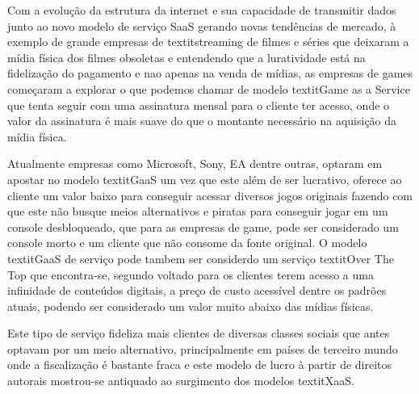 \begin{justify}
    Com a evolução da estrutura da internet e sua capacidade de transmitir dados junto ao novo
    modelo de serviço SaaS gerando novas tendências de mercado, à exemplo de grande empresas de
    textit{streaming} de filmes e séries que deixaram a mídia física dos filmes obsoletas e
    entendendo que a luratividade está na fidelização do pagamento e nao apenas na venda de mídias,
    as empresas de games começaram a explorar o que podemos chamar de modelo textit{Game as a
    Service} que tenta seguir com uma assinatura mensal para o cliente ter acesso, onde o valor da
    assinatura é mais suave do que o montante necessário na aquisição da mídia física.

    Atualmente empresas como Microsoft, Sony, EA dentre outras, optaram em apostar no modelo            
    textit{GaaS} um vez que este além de ser lucrativo, oferece ao cliente um valor baixo para          
    conseguir acessar diversos jogos originais fazendo com que este não busque meios alternativos e     
    piratas para conseguir jogar em um console desbloqueado, que para as empresas de game, pode ser     
    considerado um console morto e um cliente que não consome da fonte original.                        
    O modelo textit{GaaS} de serviço pode tambem ser considerdo um serviço textit{Over The Top} que     
    encontra-se, segundo \cite{tristao2020pirataria} voltado para os clientes terem acesso a uma        
    infinidade de conteúdos digitais, a preço de custo acessível dentre os padrões atuais, podendo      
    ser considerado um valor muito abaixo das mídias físicas.                                           
                                                                                                        
    Este tipo de serviço fideliza mais clientes de diversas classes sociais que antes optavam por um    
    meio alternativo, principalmente em países de terceiro mundo onde a fiscalização é bastante         
    fraca e este modelo de lucro à partir de direitos autorais mostrou-se antiquado ao surgimento       
    dos modelos textit{XaaS}.                                                                           
                                                                                                        

\end{justify}
